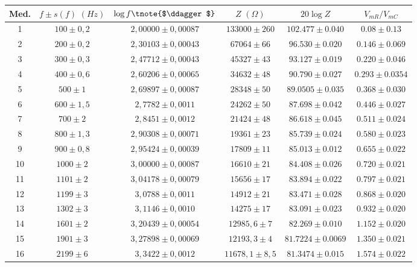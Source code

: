 \documentclass[11pt]{report}
\begin{document}
\begin{refsection}
\begin{table}[H]
\centering
\begin{threeparttable}
\begin{tabular}{|c|c|c|c|c|c|}
\hline
Med. & $f \pm s(f)\hspace{4pt} (Hz)$ & $\log f\tnote{$\ddagger$}$ & $Z \hspace{4pt} (\Omega)$ & $20\log Z$ & $V_{mR}/V_{mC}$\\
\hline
1 & $100 \pm 0,2$ & $2,00000 \pm 0,00087$ & $133000 \pm 260$&$102.477\pm 0.040$&$0.08\pm0.13$\\
2 & $200 \pm 0,2$ & $2,30103 \pm 0,00043$ & $67064 \pm 66$&$96.530\pm0.020$&$0.146\pm0.069$\\
3 & $300 \pm 0,3$ & $2,47712 \pm 0,00043$ & $45327 \pm 43$&$93.127\pm0.019$&$0.220\pm0.046$\\
4 & $400 \pm 0,6$ & $2,60206 \pm 0,00065$ & $34632 \pm 48$&$90.790\pm0.027$&$0.293\pm0.0354$\\
5 & $500 \pm 1$ & $2,69897 \pm 0,00087$ & $28348 \pm 50$&$89.0505\pm0.035$&$0.368\pm0.030$\\
6 & $600 \pm 1,5$ & $2,7782 \pm 0,0011$  & $24262 \pm 50$&$87.698\pm0.042$&$0.446\pm0.027$\\
7 & $700 \pm 2$ & $2,8451 \pm 0,0012$ & $21424 \pm 48$&$86.618\pm0.045$&$0.511\pm0.024$\\
8 & $800 \pm 1,3$ & $2,90308 \pm 0,00071$ & $19361 \pm 23$&$85.739\pm0.024$&$0.580\pm0.023$\\
9 & $900 \pm 0,8$ & $2,95424 \pm 0,00039$ & $17809 \pm 11$&$85.013\pm0.012$&$0.655\pm0.022$\\
10 & $1000 \pm 2$ & $3,00000 \pm 0,00087$ & $16610 \pm 21$&$84.408\pm0.026$&$0.720\pm0.021$\\
11 & $1101 \pm 2$ & $3,04178 \pm 0,00079$ & $15656 \pm 17$&$83.894\pm0.022$&$0.797\pm0.021$\\
12 & $1199 \pm 3$ & $3,0788 \pm 0,0011$ & $14912\pm 21$&$83.471\pm0.028$&$0.868\pm0.020$\\
13 & $1302 \pm 3$ & $3,1146 \pm 0,0010$ & $14275\pm 17$&$83.091\pm0.023$&$0.932\pm0.020$\\
14 & $1601 \pm 2$ & $3,20439 \pm 0,00054$ & $12985,6\pm 7$&$82.269\pm0.010$&$1.152\pm0.020$\\
15 & $1901 \pm 3$ & $3,27898 \pm 0,00069$ & $12193,3\pm 4$&$81.7224\pm0.0069$&$1.350\pm0.021$\\
16 & $2199 \pm 6$ & $3,3422 \pm 0,0012$ & $11678,1\pm 8,5$&$81.3474\pm0.015$&$1.574\pm0.022$\\

\end{tabular}
\end{threeparttable}
\end{table}
\end{refsection}
\end{document}
